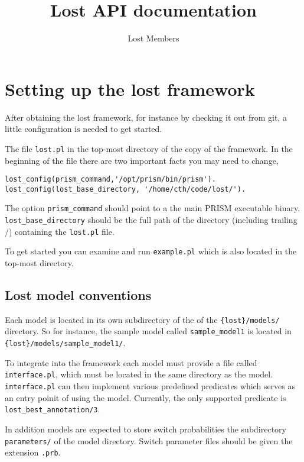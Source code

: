 \documentclass{book}
\title{Lost API documentation}
\author{Lost Members}
\begin{document}
\maketitle


\tableofcontents
%

\chapter{Setting up the lost framework}

After obtaining the lost framework, for instance by checking it out
from git, a little configuration is needed to get started.

The file \texttt{lost.pl} in the top-most directory of the copy
of the framework. In the beginning of the file there are two 
important facts you may need to change,
\begin{verbatim}
lost_config(prism_command,'/opt/prism/bin/prism').
lost_config(lost_base_directory, '/home/cth/code/lost/').
\end{verbatim}

The option \texttt{prism\_command} should point to a the main PRISM executable
binary. \\
\texttt{lost\_base\_directory} should be the full path of the
directory (including trailing /) containing the \texttt{lost.pl}
file. 

To get started you can examine and run \texttt{example.pl} which 
is also located in the top-most directory.

\section{Lost model conventions}\label{sec:lost_model_conventions}

Each model is located in its own subdirectory of the of the
\texttt{\{lost\}/models/} directory. So for instance, the sample model
called \texttt{sample\_model1} is located in
\texttt{\{lost\}/models/sample\_model1/}.

To integrate into the framework each model must provide a file called
\texttt{interface.pl}, which must be located in the same directory as
the model. \texttt{interface.pl} can then implement various predefined
predicates which serves as an entry poinit of using the
model. Currently, the only supported predicate is
\texttt{lost\_best\_annotation/3}.

In addition models are expected to store switch probabilities the
subdirectory \texttt{parameters/} of the model directory. Switch
parameter files should be given the extension \texttt{.prb}.
\end{document}
